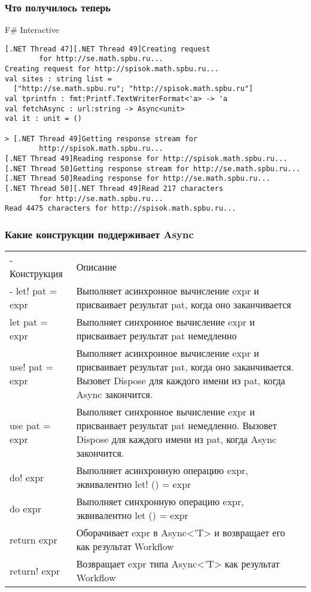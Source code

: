 \documentclass[xetex,mathserif,serif]{beamer}
\begin{document}
    \begin{frame}[fragile]
        \frametitle{Что получилось теперь}
   		\begin{alertblock}{F\# Interactive}
   			\begin{lstlisting}[basicstyle=\scriptsize,keywordstyle=\color{black},emphstyle=\color{black}]
[.NET Thread 47][.NET Thread 49]Creating request 
        for http://se.math.spbu.ru...
Creating request for http://spisok.math.spbu.ru...
val sites : string list =
  ["http://se.math.spbu.ru"; "http://spisok.math.spbu.ru"]
val tprintfn : fmt:Printf.TextWriterFormat<'a> -> 'a
val fetchAsync : url:string -> Async<unit>
val it : unit = ()

> [.NET Thread 49]Getting response stream for 
        http://spisok.math.spbu.ru...
[.NET Thread 49]Reading response for http://spisok.math.spbu.ru...
[.NET Thread 50]Getting response stream for http://se.math.spbu.ru...
[.NET Thread 50]Reading response for http://se.math.spbu.ru...
[.NET Thread 50][.NET Thread 49]Read 217 characters 
        for http://se.math.spbu.ru...
Read 4475 characters for http://spisok.math.spbu.ru...
\end{lstlisting}
\end{alertblock}
\end{frame}

	\begin{frame}
		\frametitle{Какие конструкции поддерживает Async}
		\begin{footnotesize}
			\begin{tabu} {| X[0.3 l p] | X[1 l p] |}
				\tabucline-
				Конструкция               & Описание           \\
				\tabucline-
				\everyrow{\tabucline-}
				let! pat = expr           & Выполняет асинхронное вычисление expr и присваивает результат pat, когда оно заканчивается   \\
				let pat = expr            & Выполняет синхронное вычисление expr и присваивает результат pat немедленно \\
				use! pat = expr           & Выполняет асинхронное вычисление expr и присваивает результат pat, когда оно заканчивается. Вызовет Dispose для каждого имени из pat, когда Async закончится.    \\
				use pat = expr            & Выполняет синхронное вычисление expr и присваивает результат pat немедленно. Вызовет Dispose для каждого имени из pat, когда Async закончится. \\
				do! expr                  & Выполняет асинхронную операцию expr, эквивалентно let! () = expr \\
				do expr                   & Выполняет синхронную операцию expr, эквивалентно let () = expr \\
				return expr               & Оборачивает expr в Async<'T> и возвращает его как результат Workflow \\
				return! expr              & Возвращает expr типа Async<'T> как результат Workflow \\
   			\end{tabu}
		\end{footnotesize}
	\end{frame}
\end{document}
